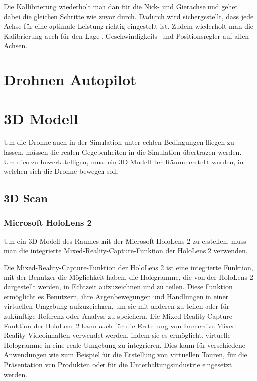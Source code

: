 Die Kallibrierung wiederholt man dan für die Nick- und Gierachse und gehet dabei die gleichen Schritte wie zuvor durch. Dadurch wird sichergestellt, dass jede Achse für eine optimale Leistung richtig eingestellt ist. Zudem wiederholt man die Kalibrierung auch für den Lage-, Geschwindigkeits- und Positionsregler auf allen Achsen.



\section{Drohnen Autopilot} \label{drohnen_autopilot:subsection}


\section{3D Modell} \label{3d_modell:section}
Um die Drohne auch in der Simulation unter echten Bedingungen fliegen zu lassen, müssen die realen Gegebenheiten in die Simulation übertragen werden. Um dies zu bewerkstelligen, muss ein 3D-Modell der Räume erstellt werden, in welchen sich die Drohne bewegen soll.
    \subsection{3D Scan} \label{3d-scan:subsection}

        \subsubsection{Microsoft HoloLens 2} \label{hololens:subsubsection}
        Um ein 3D-Modell des Raumes mit der Microsoft HoloLens 2 zu erstellen, muss man die integrierte Mixed-Reality-Capture-Funktion der HoloLens 2 verwenden.
        
        Die Mixed-Reality-Capture-Funktion der HoloLens 2 ist eine integrierte Funktion, mit der Benutzer die Möglichkeit haben, die Hologramme, die von der HoloLens 2 dargestellt werden, in Echtzeit aufzuzeichnen und zu teilen. Diese Funktion ermöglicht es Benutzern, ihre Augenbewegungen und Handlungen in einer virtuellen Umgebung aufzuzeichnen, um sie mit anderen zu teilen oder für zukünftige Referenz oder Analyse zu speichern. Die Mixed-Reality-Capture-Funktion der HoloLens 2 kann auch für die Erstellung von Immersive-Mixed-Reality-Videoinhalten verwendet werden, indem sie es ermöglicht, virtuelle Hologramme in eine reale Umgebung zu integrieren. Dies kann für verschiedene Anwendungen wie zum Beispiel für die Erstellung von virtuellen Touren, für die Präsentation von Produkten oder für die Unterhaltungsindustrie eingesetzt werden.


